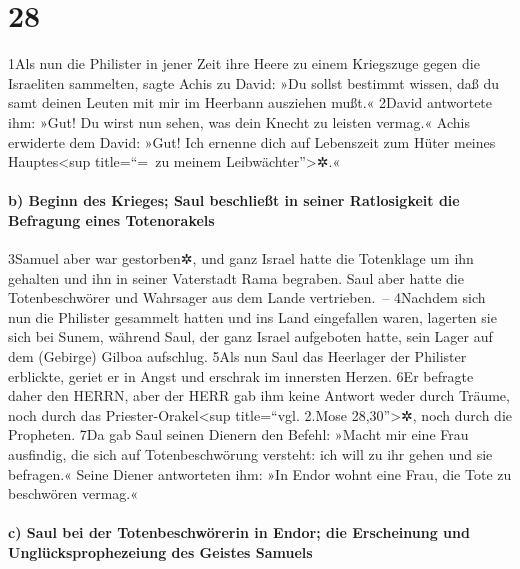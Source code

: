 \hypertarget{section-27}{%
\section{28}\label{section-27}}

1Als nun die Philister in jener Zeit ihre Heere zu einem Kriegszuge
gegen die Israeliten sammelten, sagte Achis zu David: »Du sollst
bestimmt wissen, daß du samt deinen Leuten mit mir im Heerbann ausziehen
mußt.« 2David antwortete ihm: »Gut! Du wirst nun sehen, was dein Knecht
zu leisten vermag.« Achis erwiderte dem David: »Gut! Ich ernenne dich
auf Lebenszeit zum Hüter meines Hauptes\textless sup title=``=~zu meinem
Leibwächter''\textgreater✲.«

\hypertarget{b-beginn-des-krieges-saul-beschlieuxdft-in-seiner-ratlosigkeit-die-befragung-eines-totenorakels}{%
\paragraph{b) Beginn des Krieges; Saul beschließt in seiner Ratlosigkeit
die Befragung eines
Totenorakels}\label{b-beginn-des-krieges-saul-beschlieuxdft-in-seiner-ratlosigkeit-die-befragung-eines-totenorakels}}

3Samuel aber war gestorben✲, und ganz Israel hatte die Totenklage um ihn
gehalten und ihn in seiner Vaterstadt Rama begraben. Saul aber hatte die
Totenbeschwörer und Wahrsager aus dem Lande vertrieben.~-- 4Nachdem sich
nun die Philister gesammelt hatten und ins Land eingefallen waren,
lagerten sie sich bei Sunem, während Saul, der ganz Israel aufgeboten
hatte, sein Lager auf dem (Gebirge) Gilboa aufschlug. 5Als nun Saul das
Heerlager der Philister erblickte, geriet er in Angst und erschrak im
innersten Herzen. 6Er befragte daher den HERRN, aber der HERR gab ihm
keine Antwort weder durch Träume, noch durch das
Priester-Orakel\textless sup title=``vgl. 2.Mose 28,30''\textgreater✲,
noch durch die Propheten. 7Da gab Saul seinen Dienern den Befehl: »Macht
mir eine Frau ausfindig, die sich auf Totenbeschwörung versteht: ich
will zu ihr gehen und sie befragen.« Seine Diener antworteten ihm: »In
Endor wohnt eine Frau, die Tote zu beschwören vermag.«

\hypertarget{c-saul-bei-der-totenbeschwuxf6rerin-in-endor-die-erscheinung-und-ungluxfccksprophezeiung-des-geistes-samuels}{%
\paragraph{c) Saul bei der Totenbeschwörerin in Endor; die Erscheinung
und Unglücksprophezeiung des Geistes
Samuels}\label{c-saul-bei-der-totenbeschwuxf6rerin-in-endor-die-erscheinung-und-ungluxfccksprophezeiung-des-geistes-samuels}}

